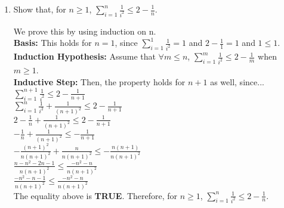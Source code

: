 \documentclass[12pt]{article}
\begin{document}
\begin{enumerate}


\item Show that, for $n \geq 1$, $\sum\limits^{n}_{i=1}\frac{1}{i^2} \leq 2 - \frac{1}{n}$.

We prove this by using induction on n.\\
\textbf{Basis:} This holds for $n = 1$, since $\sum\limits^{1}_{i=1}\frac{1}{i^2} = 1$ and $2 - \frac{1}{1} = 1$ and $1 \leq 1$.\\
\textbf{Induction Hypothesis:} Assume that $\forall m \leq n$, $\sum\limits^{m}_{i=1}\frac{1}{i^2} \leq 2 - \frac{1}{m}$ when $m \geq 1$.\\
\textbf{Inductive Step:} Then, the property holds for $n + 1$ as well, since...\\
$\sum\limits^{n + 1}_{i=1}\frac{1}{i^2} \leq 2 - \frac{1}{n + 1}$\\
$\sum\limits^n_{i=1}\frac{1}{i^2} + \frac{1}{(n + 1)^2} \leq 2 - \frac{1}{n + 1}$\\
$2 - \frac{1}{n} + \frac{1}{(n + 1)^2} \leq 2 - \frac{1}{n + 1}$\\
$- \frac{1}{n} + \frac{1}{(n + 1)^2} \leq - \frac{1}{n + 1}$\\
$- \frac{(n + 1)^2}{n(n + 1)^2} + \frac{n}{n(n + 1)^2} \leq - \frac{n(n + 1)}{n(n + 1)^2}$\\
$\frac{n - n^2 - 2n - 1}{n(n + 1)^2} \leq \frac{-n^2 - n}{n(n + 1)^2}$\\
$\frac{-n^2 - n - 1}{n(n + 1)^2} \leq \frac{-n^2 - n}{n(n + 1)^2}$\\
The equality above is \textbf{TRUE}. Therefore, for $n \geq 1$, $\sum\limits^{n}_{i=1}\frac{1}{i^2} \leq 2 - \frac{1}{n}$.


\end{enumerate}
\end{document}

